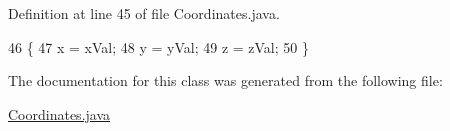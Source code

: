 Definition at line 45 of file Coordinates.\+java.


\begin{DoxyCode}
46     \{
47         x = xVal;
48         y = yVal;
49         z = zVal;
50     \}
\end{DoxyCode}


The documentation for this class was generated from the following file\+:\begin{DoxyCompactItemize}
\item 
\hyperlink{_coordinates_8java}{Coordinates.\+java}\end{DoxyCompactItemize}
